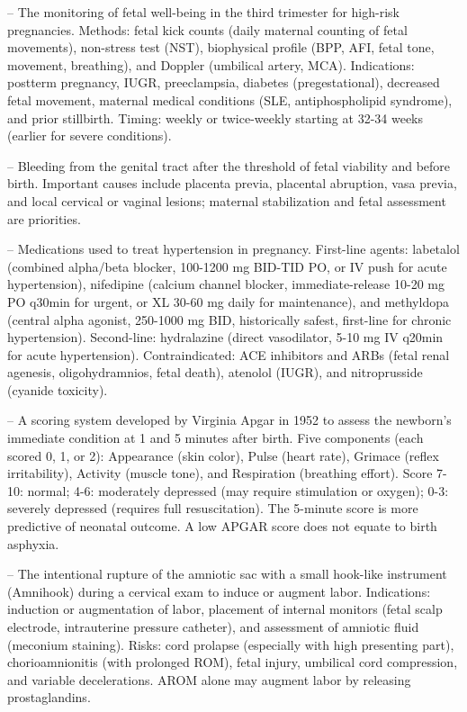 -- The monitoring of fetal well-being in the third trimester for high-risk pregnancies. Methods: fetal kick counts (daily maternal counting of fetal movements), non-stress test (NST), biophysical profile (BPP, AFI, fetal tone, movement, breathing), and Doppler (umbilical artery, MCA). Indications: postterm pregnancy, IUGR, preeclampsia, diabetes (pregestational), decreased fetal movement, maternal medical conditions (SLE, antiphospholipid syndrome), and prior stillbirth. Timing: weekly or twice-weekly starting at 32-34 weeks (earlier for severe conditions).

-- Bleeding from the genital tract after the threshold of fetal viability and before birth. Important causes include placenta previa, placental abruption, vasa previa, and local cervical or vaginal lesions; maternal stabilization and fetal assessment are priorities.

-- Medications used to treat hypertension in pregnancy. First-line agents: labetalol (combined alpha/beta blocker, 100-1200 mg BID-TID PO, or IV push for acute hypertension), nifedipine (calcium channel blocker, immediate-release 10-20 mg PO q30min for urgent, or XL 30-60 mg daily for maintenance), and methyldopa (central alpha agonist, 250-1000 mg BID, historically safest, first-line for chronic hypertension). Second-line: hydralazine (direct vasodilator, 5-10 mg IV q20min for acute hypertension). Contraindicated: ACE inhibitors and ARBs (fetal renal agenesis, oligohydramnios, fetal death), atenolol (IUGR), and nitroprusside (cyanide toxicity).

-- A scoring system developed by Virginia Apgar in 1952 to assess the newborn's immediate condition at 1 and 5 minutes after birth. Five components (each scored 0, 1, or 2): Appearance (skin color), Pulse (heart rate), Grimace (reflex irritability), Activity (muscle tone), and Respiration (breathing effort). Score 7-10: normal; 4-6: moderately depressed (may require stimulation or oxygen); 0-3: severely depressed (requires full resuscitation). The 5-minute score is more predictive of neonatal outcome. A low APGAR score does not equate to birth asphyxia.

-- The intentional rupture of the amniotic sac with a small hook-like instrument (Amnihook) during a cervical exam to induce or augment labor. Indications: induction or augmentation of labor, placement of internal monitors (fetal scalp electrode, intrauterine pressure catheter), and assessment of amniotic fluid (meconium staining). Risks: cord prolapse (especially with high presenting part), chorioamnionitis (with prolonged ROM), fetal injury, umbilical cord compression, and variable decelerations. AROM alone may augment labor by releasing prostaglandins.

